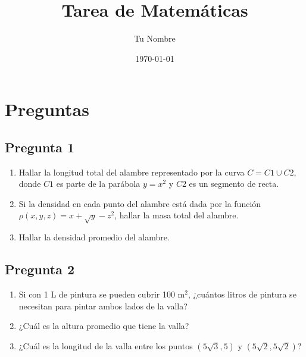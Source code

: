 \documentclass{article}
\begin{document}
\title{Tarea de Matemáticas}
\author{Tu Nombre}
\date{\today}
\maketitle

\section*{Preguntas}

\subsection*{Pregunta 1}
\begin{enumerate}
    \item Hallar la longitud total del alambre representado por la curva \( C = C1 \cup C2 \), donde \( C1 \) es parte de la parábola \( y = x^2 \) y \( C2 \) es un segmento de recta.
    \item Si la densidad en cada punto del alambre está dada por la función \( \rho(x, y, z) = x + \sqrt{y} - z^2 \), hallar la masa total del alambre.
    \item Hallar la densidad promedio del alambre.
\end{enumerate}

\subsection*{Pregunta 2}
\begin{enumerate}
    \item Si con 1 L de pintura se pueden cubrir 100 m\(^2\), ¿cuántos litros de pintura se necesitan para pintar ambos lados de la valla?
    \item ¿Cuál es la altura promedio que tiene la valla?
    \item ¿Cuál es la longitud de la valla entre los puntos \( (5\sqrt{3}, 5) \) y \( (5\sqrt{2}, 5\sqrt{2}) \)?
\end{enumerate}
\end{document}
